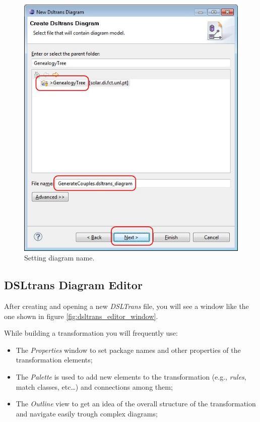 \begin{figure}[h]
\begin{center}
  \includegraphics[scale=0.6]{imgs/create_dsltransformation_2.jpg}
  \caption{Setting diagram name.}
  \label{fig:create_dsltransformation_2}
\end{center}
\end{figure}

\clearpage

\subsection{DSLtrans Diagram Editor}

After creating and opening a new \emph{DSLTrans} file, you will see a window
like the one shown in figure \ref{fig:dsltrans_editor_window}.

While building a transformation you will frequently use:
\begin{itemize}
  \item The \emph{Properties} window to set package names and other properties
  of the transformation elements;
  \item The \emph{Palette} is used to add new elements to the transformation
  (e.g., \emph{rules}, match classes, etc\ldots) and connections among them;
  \item The \emph{Outline} view to get an idea of the overall structure of the
  transformation and navigate easily trough complex diagrams;
\end{itemize}

